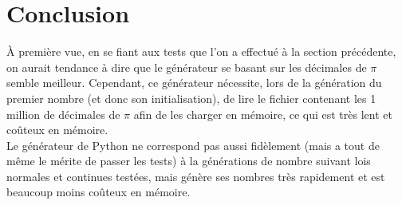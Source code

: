\documentclass[10pt,a4paper]{article}
\begin{document}
\section{Conclusion}
\`A première vue, en se fiant aux tests que l'on a effectué à la section précédente, on aurait tendance à dire que le générateur se basant sur les décimales de $\pi$ semble meilleur. Cependant, ce générateur nécessite, lors de la génération du premier nombre (et donc son initialisation), de lire le fichier contenant les 1 million de décimales de $\pi$ afin de les charger en mémoire, ce qui est très lent et coûteux en mémoire.\\
Le générateur de Python ne correspond pas aussi fidèlement (mais a tout de même le mérite de passer les tests) à la générations de nombre suivant lois normales et continues testées, mais génère ses nombres très rapidement et est beaucoup moins coûteux en mémoire.
\end{document}
